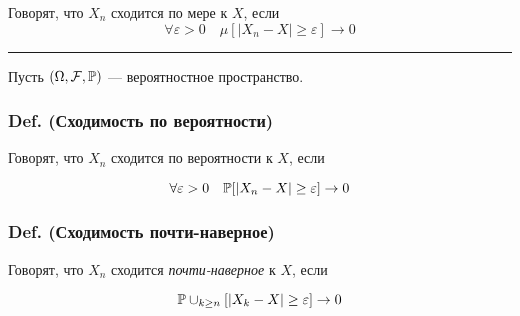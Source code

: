 Говорят, что \(X_n\) сходится по мере к \(X\), если
\[\forall\varepsilon > 0 \quad \mu\left[{ |X_n - X| \geq \varepsilon }\right] \to 0\]

\begin{center}\rule{0.5\linewidth}{\linethickness}\end{center}

Пусть \((\Omega, \mathcal F, \mathbb P)\) --- вероятностное пространство.

\subsubsection{Def. (Сходимость по
вероятности)}\label{def.-ux441ux445ux43eux434ux438ux43cux43eux441ux442ux44c-ux43fux43e-ux432ux435ux440ux43eux44fux442ux43dux43eux441ux442ux438}

Говорят, что \(X_n\) сходится по вероятности к \(X\), если

\[\forall\varepsilon > 0 \quad \mathbb P [|X_n - X|\geq\varepsilon] \to 0\]

\subsubsection{Def. (Сходимость
почти-наверное)}\label{def.-ux441ux445ux43eux434ux438ux43cux43eux441ux442ux44c-ux43fux43eux447ux442ux438-ux43dux430ux432ux435ux440ux43dux43eux435}

Говорят, что \(X_n\) сходится \emph{почти-наверное} к \(X\), если

\[ \mathbb P \cup_{k\geq n} [ |X_k - X| \geq\varepsilon] \to 0 \]
